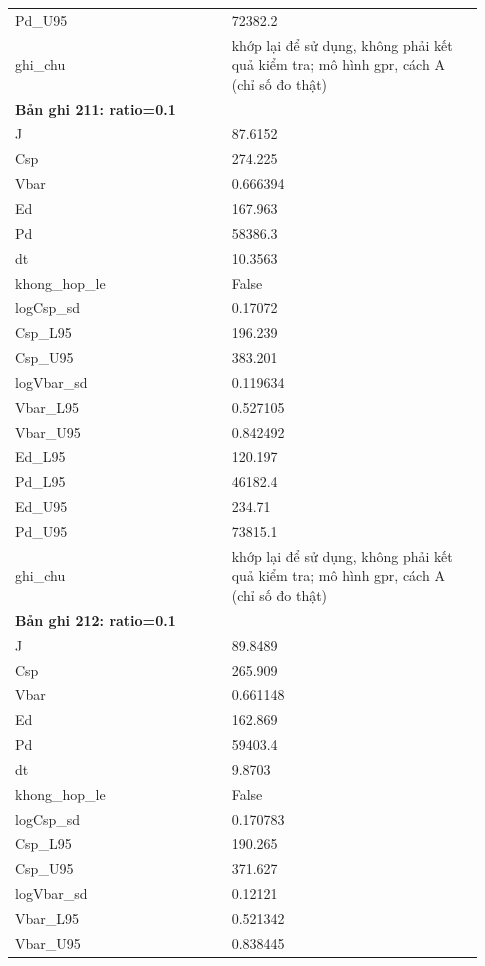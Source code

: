 \begin{longtable}{p{0.43\linewidth}p{0.50\linewidth}}
Pd\_\allowbreak U95 & 72382.2 \\
ghi\_\allowbreak chu & khớp lại để sử dụng, không phải kết quả kiểm tra; mô hình gpr, cách A (chỉ số đo thật) \\
\midrule
\multicolumn{2}{p{0.95\linewidth}}{\textbf{Bản ghi 211: ratio=0.1}} \\
J & 87.6152 \\
Csp & 274.225 \\
Vbar & 0.666394 \\
Ed & 167.963 \\
Pd & 58386.3 \\
dt & 10.3563 \\
khong\_\allowbreak hop\_\allowbreak le & False \\
logCsp\_\allowbreak sd & 0.17072 \\
Csp\_\allowbreak L95 & 196.239 \\
Csp\_\allowbreak U95 & 383.201 \\
logVbar\_\allowbreak sd & 0.119634 \\
Vbar\_\allowbreak L95 & 0.527105 \\
Vbar\_\allowbreak U95 & 0.842492 \\
Ed\_\allowbreak L95 & 120.197 \\
Pd\_\allowbreak L95 & 46182.4 \\
Ed\_\allowbreak U95 & 234.71 \\
Pd\_\allowbreak U95 & 73815.1 \\
ghi\_\allowbreak chu & khớp lại để sử dụng, không phải kết quả kiểm tra; mô hình gpr, cách A (chỉ số đo thật) \\
\midrule
\multicolumn{2}{p{0.95\linewidth}}{\textbf{Bản ghi 212: ratio=0.1}} \\
J & 89.8489 \\
Csp & 265.909 \\
Vbar & 0.661148 \\
Ed & 162.869 \\
Pd & 59403.4 \\
dt & 9.8703 \\
khong\_\allowbreak hop\_\allowbreak le & False \\
logCsp\_\allowbreak sd & 0.170783 \\
Csp\_\allowbreak L95 & 190.265 \\
Csp\_\allowbreak U95 & 371.627 \\
logVbar\_\allowbreak sd & 0.12121 \\
Vbar\_\allowbreak L95 & 0.521342 \\
Vbar\_\allowbreak U95 & 0.838445 \\

\end{longtable}
